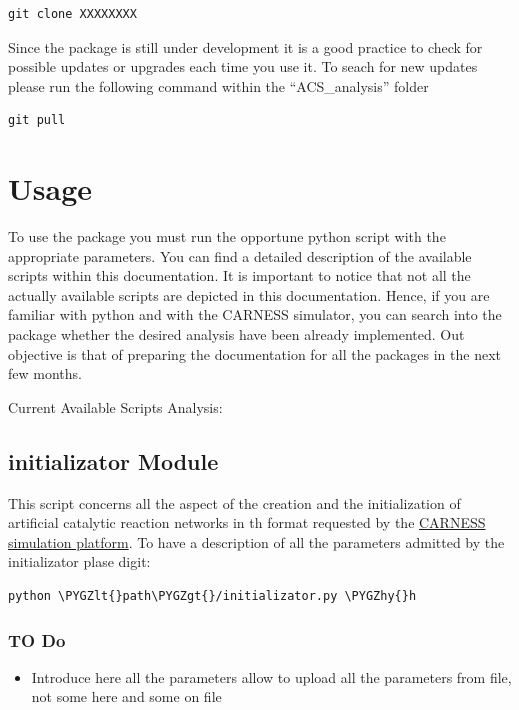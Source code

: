 \documentclass[letterpaper,10pt,english]{sphinxmanual}
\def\PYGZlt{\char`\<}
\def\PYGZgt{\char`\>}
\def\PYGZhy{\char`\-}
\begin{document}
\begin{Verbatim}[commandchars=\\\{\}]
git clone XXXXXXXX
\end{Verbatim}

Since the package is still under development it is a good practice to check for possible updates or upgrades each time you use it. To seach for new updates please run the following command within the ``ACS\_analysis'' folder

\begin{Verbatim}[commandchars=\\\{\}]
git pull
\end{Verbatim}


\chapter{Usage}
\label{index:usage}
To use the package you must run the opportune python script with the appropriate parameters. You can find a detailed description of the available scripts within this documentation.
It is important to notice that not all the actually available scripts are depicted in this documentation. Hence, if you are familiar with python and with the CARNESS simulator, you can search into the package whether the desired analysis have been already implemented.
Out objective is that of preparing the documentation for all the packages in the next few months.

Current Available Scripts Analysis:


\section{initializator Module}
\label{initializator:initializator-module}\label{initializator::doc}\label{initializator:module-initializator}
This script concerns all the aspect of the creation and the initialization of artificial catalytic reaction networks in th format 
requested by the \href{http://github.org/carness}{CARNESS simulation platform}.
To have a description of all the parameters admitted by the initializator plase digit:

\begin{Verbatim}[commandchars=\\\{\}]
python \PYGZlt{}path\PYGZgt{}/initializator.py \PYGZhy{}h
\end{Verbatim}


\subsection{TO Do}
\label{initializator:to-do}\begin{itemize}
\item {} 
Introduce here all the parameters allow to upload all the parameters from file, not some here and some on file

\end{itemize}
\end{document}
